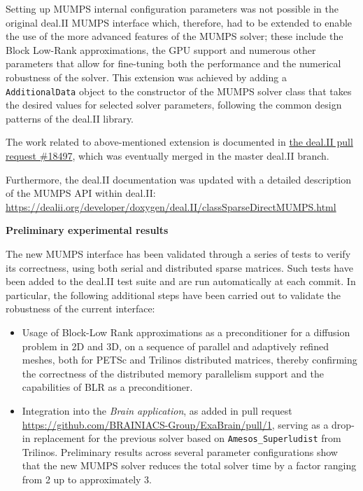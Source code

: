 \documentclass[a4paper,12pt, numbers]{article}
\begin{document}
Setting up MUMPS internal configuration parameters was not possible in
the original deal.II MUMPS interface which, therefore, had to be
extended to enable the use of the more advanced features of the MUMPS
solver; these include the Block Low-Rank approximations, the GPU
support and numerous other parameters that allow for fine-tuning both
the performance and the numerical robustness of the solver. This
extension was achieved by adding a \texttt{AdditionalData} object
to the constructor of the MUMPS solver class that takes the desired
values for selected solver parameters, following the common design
patterns of the deal.II library.

The work related to above-mentioned extension is documented in \href{https://github.com/dealii/dealii/pull/18497}{the deal.II pull
request \#18497},
which was eventually merged in the master deal.II branch.

Furthermore, the deal.II documentation was updated with a detailed description
of the MUMPS API within deal.II: \url{https://dealii.org/developer/doxygen/deal.II/classSparseDirectMUMPS.html}


\noindent\textbf{Preliminary experimental results}

The new MUMPS interface has been validated through a series of tests
to verify its correctness, using both serial and distributed sparse matrices. Such tests
have been added to the deal.II test suite and are run automatically at
each commit. In particular, the following additional steps have
been carried out to validate the robustness of the current interface:
\begin{itemize}
\item Usage of Block-Low Rank approximations as a preconditioner
for a diffusion problem in 2D and 3D, on a sequence of parallel and
adaptively refined meshes, both for PETSc and Trilinos distributed matrices, thereby
confirming the correctness of the distributed memory parallelism
support and the capabilities of BLR as a preconditioner.
\item Integration into the \emph{Brain application}, as added
in pull request \url{https://github.com/BRAINIACS-Group/ExaBrain/pull/1}, serving as a
drop-in replacement for the previous solver based on \texttt{Amesos\_Superludist}
from Trilinos. Preliminary results across several
parameter configurations show that the new MUMPS solver
reduces the total solver time by a factor
ranging from 2 up to approximately 3.

\end{itemize}
\end{document}
